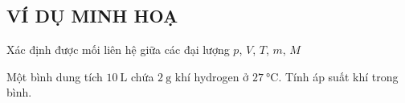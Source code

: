 \subsection{VÍ DỤ MINH HOẠ}
\begin{dang}{Xác định được mối liên hệ giữa các đại lượng $p$, $V$, $T$, $m$, $ M$}
	\end{dang}
\begin{vd}
	Một bình dung tích $\SI{10}{\liter}$ chứa $\SI{2}{\gram}$ khí hydrogen ở $\SI{27}{\celsius}$. Tính áp suất khí trong bình.
\end{vd}
